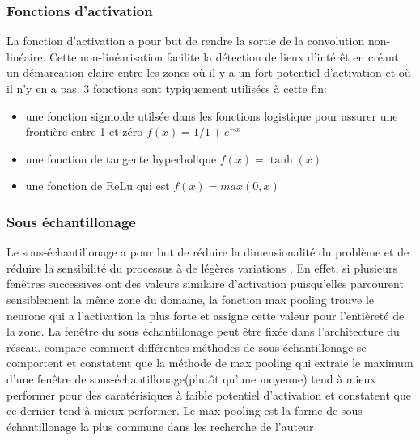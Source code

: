     \subsubsection{Fonctions d'activation}\label{sssection:activ_fn}
    La fonction d'activation a pour but de rendre la sortie de la convolution non-linéaire. Cette non-linéarisation facilite la détection de lieux d'intérêt en créant un démarcation claire entre les zones où il y a un fort potentiel d'activation et où il n'y en a pas. 3 fonctions sont typiquement utilisées à cette fin: 
      \begin{itemize}
        \item une fonction sigmoide utilsée dans les fonctions logistique pour assurer une frontière entre 1 et zéro $f(x) = 1/1+ e^{-x} $
        \item une fonction de tangente hyperbolique $f(x) = \tanh(x) $ 
        \item une fonction de \ac{ReLu} qui est $f(x)  = max(0,x) $
      \end{itemize}
    \subsubsection{Sous échantillonage}
    Le sous-échantillonage a pour but de réduire la dimensionalité du problème et de réduire la sensibilité du processus à de légères variations \parencite{Lecun:ConvolutionalNetworks:1995}. En effet, si plusieurs fenêtres successives ont des valeurs similaire d'activation puisqu'elles parcourent sensiblement la même zone du domaine, la fonction max pooling trouve le neurone qui a l'activation la plus forte et assigne cette valeur pour l'entièreté de la zone. La fenêtre du sous échantillonage peut être fixée dans l'architecture du réseau. \textcite{Boureau:TheoreticalAnalysis:2010} compare comment différentes méthodes de sous échantillonage se comportent et constatent que la méthode de max pooling qui extraie le maximum d'une fenêtre de sous-échantillonage(plutôt qu'une moyenne) tend à mieux performer pour des caratérisiques à faible potentiel d'activation et constatent que ce dernier tend à mieux performer. Le max pooling est la forme de sous-échantillonage la plus commune dans les recherche de l'auteur \parencite{Ronneberger:UNetConvolutional:2015, He:DeepResidual:2016}
